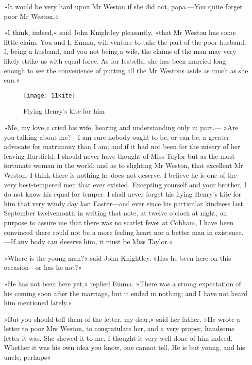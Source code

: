 »It would be very hard upon Mr Weston if she did not, papa.—You quite forget poor Mr Weston.«

»I think, indeed,« said John Knightley pleasantly, »that Mr Weston has some little claim. You and I, Emma, will venture to take the part of the poor husband. I, being a husband, and you not being a wife, the claims of the man may very likely strike us with equal force. As for Isabella, she has been married long enough to see the convenience of putting all the Mr Westons aside as much as she can.«

\begin{figure}[tbph]
\centering
\texttt{[image: 11kite]}
\caption{Flying Henry's kite for him}
\end{figure}

»Me, my love,« cried his wife, hearing and understanding only in part.— »Are you talking about me?—I am sure nobody ought to be, or can be, a greater advocate for matrimony than I am; and if it had not been for the misery of her leaving Hartfield, I should never have thought of Miss Taylor but as the most fortunate woman in the world; and as to slighting Mr Weston, that excellent Mr Weston, I think there is nothing he does not deserve. I believe he is one of the very best-tempered men that ever existed. Excepting yourself and your brother, I do not know his equal for temper. I shall never forget his flying Henry's kite for him that very windy day last Easter—and ever since his particular kindness last September twelvemonth in writing that note, at twelve o'clock at night, on purpose to assure me that there was no scarlet fever at Cobham, I have been convinced there could not be a more feeling heart nor a better man in existence.—If any body can deserve him, it must be Miss Taylor.«

»Where is the young man?« said John Knightley. »Has he been here on this occasion—or has he not?«

»He has not been here yet,« replied Emma. »There was a strong expectation of his coming soon after the marriage, but it ended in nothing; and I have not heard him mentioned lately.«

»But you should tell them of the letter, my dear,« said her father. »He wrote a letter to poor Mrs Weston, to congratulate her, and a very proper, handsome letter it was. She shewed it to me. I thought it very well done of him indeed. Whether it was his own idea you know, one cannot tell. He is but young, and his uncle, perhaps\longdash«

